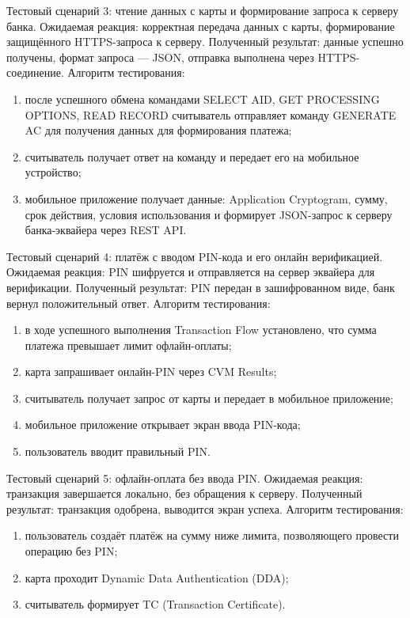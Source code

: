 Тестовый сценарий 3: чтение данных с карты и формирование запроса к серверу банка.
Ожидаемая реакция: корректная передача данных с карты, формирование защищённого HTTPS-запроса к серверу.
Полученный результат: данные успешно получены, формат запроса — JSON, отправка выполнена через HTTPS-соединение.
Алгоритм тестирования:
\begin{enumerate}
	\item после успешного обмена командами SELECT AID, GET PROCESSING OPTIONS, READ RECORD считыватель отправляет команду GENERATE AC для получения данных для формирования платежа;
	\item считыватель получает ответ на команду и передает его на мобильное устройство;
	\item мобильное приложение получает данные: Application Cryptogram, сумму, срок действия, условия использования и формирует JSON-запрос к серверу банка-эквайера через REST API.
\end{enumerate}

Тестовый сценарий 4: платёж с вводом PIN-кода и его онлайн верификацией.
Ожидаемая реакция: PIN шифруется и отправляется на сервер эквайера для верификации.
Полученный результат: PIN передан в зашифрованном виде, банк вернул положительный ответ.
Алгоритм тестирования:
\begin{enumerate}
	\item в ходе успешного выполнения Transaction Flow установлено, что сумма платежа превышает лимит офлайн-оплаты;
	\item карта запрашивает онлайн-PIN через CVM Results;
	\item считыватель получает запрос от карты и передает в мобильное приложение;
	\item мобильное приложение открывает экран ввода PIN-кода;
	\item пользователь вводит правильный PIN.
\end{enumerate}

Тестовый сценарий 5: офлайн-оплата без ввода PIN.
Ожидаемая реакция: транзакция завершается локально, без обращения к серверу.
Полученный результат: транзакция одобрена, выводится экран успеха.
Алгоритм тестирования:
\begin{enumerate}
	\item пользователь создаёт платёж на сумму ниже лимита, позволяющего провести операцию без PIN;
	\item карта проходит Dynamic Data Authentication (DDA);
	\item считыватель формирует TC (Transaction Certificate).
\end{enumerate}

